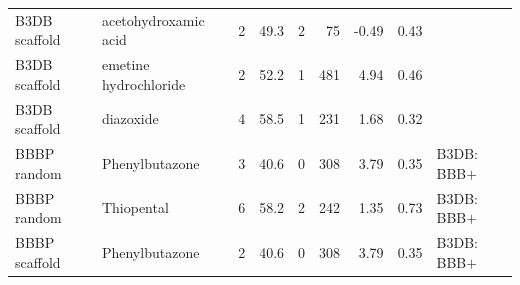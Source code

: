 \begin{tabular}{llrrrrrrl}
B3DB scaffold & acetohydroxamic acid & 2 & 49.3 & 2 & 75 & -0.49 & 0.43 & \\
B3DB scaffold & emetine hydrochloride & 2 & 52.2 & 1 & 481 & 4.94 & 0.46 & \\
B3DB scaffold & diazoxide & 4 & 58.5 & 1 & 231 & 1.68 & 0.32 & \\
BBBP random & Phenylbutazone & 3 & 40.6 & 0 & 308 & 3.79 & 0.35 & B3DB: BBB$+$\\
BBBP random & Thiopental & 6 & 58.2 & 2 & 242 & 1.35 & 0.73 & B3DB: BBB$+$\\
BBBP scaffold & Phenylbutazone & 2 & 40.6 & 0 & 308 & 3.79 & 0.35 & B3DB: BBB$+$\\
\bottomrule
\end{tabular}

